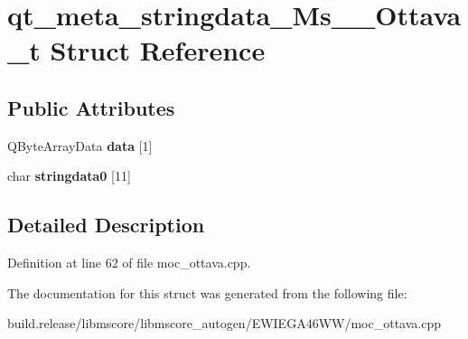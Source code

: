 \hypertarget{structqt__meta__stringdata___ms_____ottava__t}{}\section{qt\+\_\+meta\+\_\+stringdata\+\_\+\+Ms\+\_\+\+\_\+\+Ottava\+\_\+t Struct Reference}
\label{structqt__meta__stringdata___ms_____ottava__t}
\subsection*{Public Attributes}
\begin{DoxyCompactItemize}
\item 
\mbox{\label{structqt__meta__stringdata___ms_____ottava__t_ac1485d1c73bdee4278c500e98ea6d1b9}} 
Q\+Byte\+Array\+Data {\bfseries data} \mbox{[}1\mbox{]}
\item 
\mbox{\label{structqt__meta__stringdata___ms_____ottava__t_ae2d4a6aa38eee69a703e54f7c711f408}} 
char {\bfseries stringdata0} \mbox{[}11\mbox{]}
\end{DoxyCompactItemize}


\subsection{Detailed Description}


Definition at line 62 of file moc\+\_\+ottava.\+cpp.



The documentation for this struct was generated from the following file\+:\begin{DoxyCompactItemize}
\item 
build.\+release/libmscore/libmscore\+\_\+autogen/\+E\+W\+I\+E\+G\+A46\+W\+W/moc\+\_\+ottava.\+cpp\end{DoxyCompactItemize}
